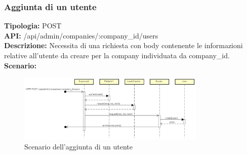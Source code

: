 \newpage
\subsubsection{Aggiunta di un utente}
\textbf{Tipologia:} POST \\
\textbf{API:} /api/admin/companies/:company\_id/users \\
\textbf{Descrizione:} Necessita di una richiesta con body contenente le informazioni relative all'utente da creare per la company individuata da company\_id. \\
\textbf{Scenario:} 
\begin{figure}[h]
\centering
\includegraphics[width=0.8\textwidth]{res/sections/backend/(POST)userSA.png}
\caption{Scenario dell'aggiunta di un utente}
\end{figure}